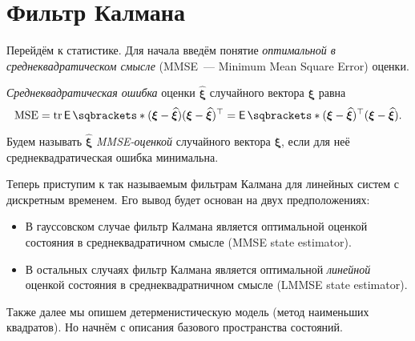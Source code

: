 \section{Фильтр Калмана}
Перейдём к статистике. Для начала введём понятие \emph{оптимальной в 
среднеквадратическом смысле} (MMSE~--- Minimum Mean Square Error) оценки.
\begin{definition}
	\emph{Среднеквадратическая ошибка} оценки \(\hat{\bm{\xi}}\) случайного 
	вектора \(\bm{\xi}\) равна
	\[
		\mathrm{MSE} = \tr{\E{(\bm{\xi} - \hat{\bm{\xi}})(\bm{\xi} - 
		\hat{\bm{\xi}})^{\top}}} = \E{(\bm{\xi} - 
		\hat{\bm{\xi}})^{\top}(\bm{\xi} - \hat{\bm{\xi}})}.
	\]
\end{definition} 
\begin{definition}
	Будем называть \(\hat{\bm{\xi}}\) \emph{MMSE-оценкой} случайного вектора 
	\(\bm{\xi}\), если для неё среднеквадратическая ошибка минимальна.
\end{definition}

Теперь приступим к так называемым фильтрам Калмана для линейных систем с 
дискретным временем. Его вывод будет основан на двух предположениях:
\begin{itemize}
	\item В гауссовском случае фильтр Калмана является оптимальной оценкой 
	состояния в среднеквадратичном смысле (MMSE state estimator).
	\item В остальных случаях фильтр Калмана является оптимальной 
	\emph{линейной} оценкой состояния в среднеквадратничном смысле (LMMSE state 
	estimator).
\end{itemize}

Также далее мы опишем детерменистическую модель (метод наименьших квадратов). 
Но начнём с описания базового пространства состояний.

